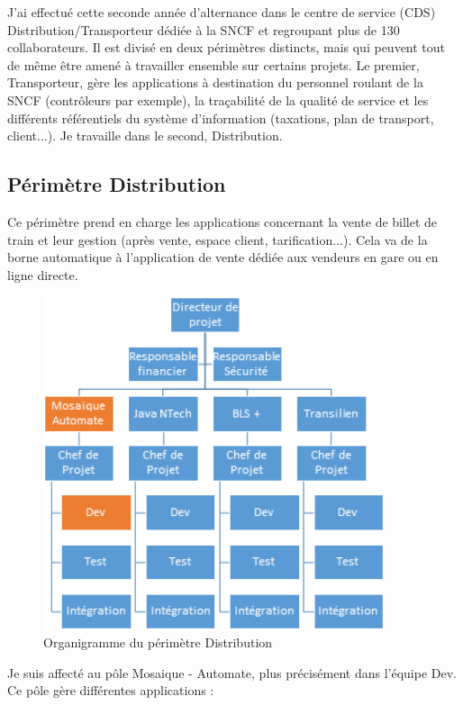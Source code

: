 J'ai effectué cette seconde année d'alternance dans le centre de service (CDS) Distribution/Transporteur dédiée à la SNCF et regroupant plus de 130 collaborateurs. Il est divisé en deux périmètres distincts, mais qui peuvent tout de même être amené à travailler ensemble sur certains projets. Le premier, Transporteur, gère les applications à destination du personnel roulant de la SNCF (contrôleurs par exemple), la traçabilité de la qualité de service et les différents référentiels du système d'information (taxations, plan de transport, client...). Je travaille dans le second, Distribution.

\clearpage
\subsection{Périmètre Distribution}

    Ce périmètre prend en charge les applications concernant la vente de billet de train et leur gestion (après vente, espace client, tarification...). Cela va de la borne automatique à l'application de vente dédiée aux vendeurs en gare ou en ligne directe.
    
    \begin{figure}[!h]
        \centering
            \includegraphics[width=10cm]{img/organigrameDistrib.png}
            \caption{Organigramme du périmètre Distribution}
            \label{fig:orgDistrib}
    \end{figure}

    Je suis affecté au pôle Mosaique - Automate, plus précisément dans l'équipe Dev. Ce pôle gère différentes applications :
    
